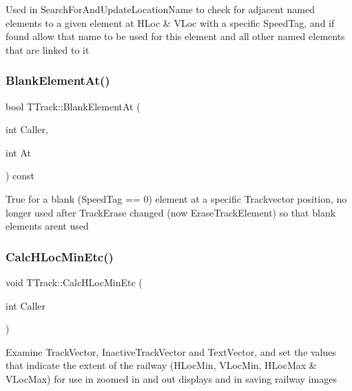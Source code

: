 Used in Search\+For\+And\+Update\+Location\+Name to check for adjacent named elements to a given element at H\+Loc \& V\+Loc with a specific Speed\+Tag, and if found allow that name to be used for this element and all other named elements that are linked to it \mbox{\label{class_t_track_a928a29de1b2a916a1c829d40b68963e9}} 
\subsubsection{\texorpdfstring{Blank\+Element\+At()}{BlankElementAt()}}
{\footnotesize\ttfamily bool T\+Track\+::\+Blank\+Element\+At (\begin{DoxyParamCaption}\item[{int}]{Caller,  }\item[{int}]{At }\end{DoxyParamCaption}) const}

True for a blank (Speed\+Tag == 0) element at a specific Trackvector position, no longer used after Track\+Erase changed (now Erase\+Track\+Element) so that blank elements aren\textquotesingle{}t used \mbox{\label{class_t_track_a20a28eaf0308f7aedcfc78ba9eeadea9}} 
\subsubsection{\texorpdfstring{Calc\+H\+Loc\+Min\+Etc()}{CalcHLocMinEtc()}}
{\footnotesize\ttfamily void T\+Track\+::\+Calc\+H\+Loc\+Min\+Etc (\begin{DoxyParamCaption}\item[{int}]{Caller }\end{DoxyParamCaption})}

Examine Track\+Vector, Inactive\+Track\+Vector and Text\+Vector, and set the values that indicate the extent of the railway (H\+Loc\+Min, V\+Loc\+Min, H\+Loc\+Max \& V\+Loc\+Max) for use in zoomed in and out displays and in saving railway images \mbox{\label{class_t_track_aa081ea276995a63dfa00fc0ace24f5c5}} 
